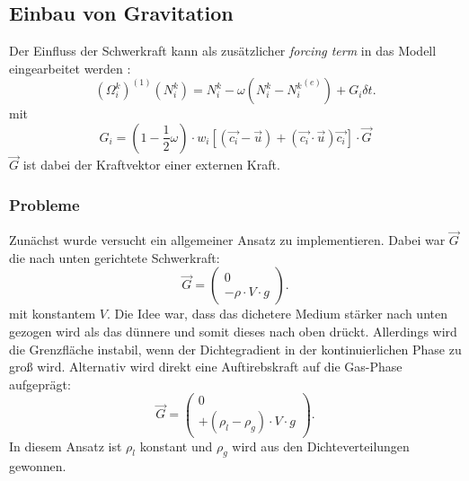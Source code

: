 \documentclass[a4paper,10pt]{scrreprt}
\begin{document}
\subsection{Einbau von Gravitation}
Der Einfluss der Schwerkraft kann als zusätzlicher \emph{forcing term} in das Modell eingearbeitet werden \cite{Guo2002}: 
\begin{equation}
 (\Omega_i^k)^{(1)} (N_i^k) = N_i^k - \omega \left(N_i^k - {N_i^k}^{(e)} \right) + G_i \delta t.
\end{equation}
mit 
\begin{equation}
 G_i = \left( 1 - \frac{1}{2} \omega  \right) \cdot w_i \left[ (\vec{c_i} - \vec{u})  + (\vec{c_i} \cdot \vec{u}) \vec{c_i}   \right] \cdot \vec{G}
\end{equation}
$\vec{G}$ ist dabei der Kraftvektor einer externen Kraft. 
\subsubsection{Probleme}
Zunächst wurde versucht ein allgemeiner Ansatz zu implementieren. Dabei war $\vec{G}$ die nach unten gerichtete Schwerkraft:
\begin{equation}
 \vec{G} = \left( \begin{array}{c} 
                   0 \\
		  - \rho \cdot V \cdot g
                  \end{array} \right) .
\end{equation}
mit konstantem $V$. 
Die Idee war, dass das dichetere Medium stärker nach unten gezogen wird als das dünnere und somit dieses nach oben drückt. 
Allerdings wird die Grenzfläche instabil, wenn der Dichtegradient in der kontinuierlichen Phase zu groß wird. 
Alternativ wird direkt eine Auftirebskraft auf die Gas-Phase aufgeprägt:
\begin{equation}
 \vec{G} = \left( \begin{array}{c} 
                   0 \\
		  + (\rho_l - \rho_g) \cdot V \cdot g
                  \end{array} \right) .
\end{equation}
In diesem Ansatz ist $\rho_l$ konstant und $\rho_g$ wird aus den Dichteverteilungen gewonnen.
 
\end{document}
